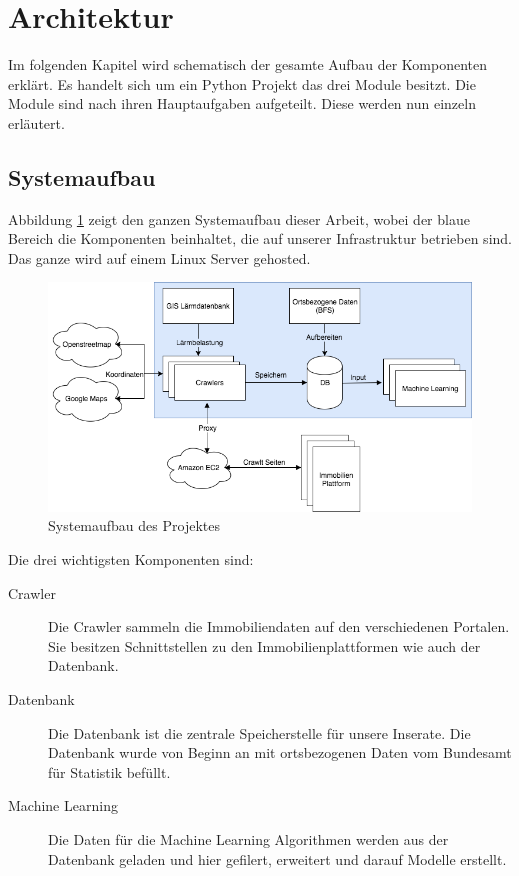\section{Architektur}
Im folgenden Kapitel wird schematisch der gesamte Aufbau der Komponenten erklärt. Es handelt sich um ein Python Projekt das drei Module besitzt. Die Module sind nach ihren Hauptaufgaben aufgeteilt. Diese werden nun einzeln erläutert.

\subsection{Systemaufbau}
Abbildung \ref{fig:system} zeigt den ganzen Systemaufbau dieser Arbeit, wobei der blaue Bereich die Komponenten beinhaltet, die auf unserer Infrastruktur betrieben sind. Das ganze wird auf einem Linux Server gehosted.

\begin{figure}[ht]
\centering
\includegraphics[width=\textwidth]{images/Architektur.png}
\caption[Systemaufbau des Projektes]{Systemaufbau des Projektes}%
\label{fig:system}
\end{figure}

Die drei wichtigsten Komponenten sind:
\begin{description}
\item[Crawler] Die Crawler sammeln die Immobiliendaten auf den verschiedenen Portalen. Sie besitzen Schnittstellen zu den Immobilienplattformen wie auch der Datenbank.
\item[Datenbank] Die Datenbank ist die zentrale Speicherstelle für unsere Inserate. Die Datenbank wurde von Beginn an mit ortsbezogenen Daten vom Bundesamt für Statistik befüllt.
\item[Machine Learning] Die Daten für die Machine Learning Algorithmen werden aus der Datenbank geladen und hier gefilert, erweitert und darauf Modelle erstellt.
\end{description}

